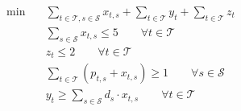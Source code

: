 \begin{align}
  \min\quad & \sum_{t \in \mathcal{T}, s \in \mathcal{S}} x_{t,s} + \sum_{t \in \mathcal{T}} y_{t} + \sum_{t \in \mathcal{T}} z_{t} \tag{total\_cost} \\
  & \sum_{s \in \mathcal{S}} x_{t,s} \le 5 \qquad \forall t \in \mathcal{T} \tag{capacity} \\
  & z_{t} \le 2 \qquad \forall t \in \mathcal{T} \tag{frequency} \\
  & \sum_{t \in \mathcal{T}} (p_{t,s} + x_{t,s}) \ge 1 \qquad \forall s \in \mathcal{S} \tag{demand} \\
  & y_{t} \ge \sum_{s \in \mathcal{S}} d_{s} \cdot x_{t,s} \qquad \forall t \in \mathcal{T} \tag{capacity} \\
\end{align}